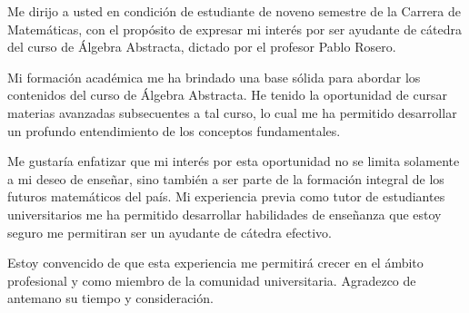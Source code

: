 \documentclass[11pt,a4paper,sans]{moderncv}        %
\begin{document}
Me dirijo a usted en condición de estudiante de noveno semestre de la Carrera de Matemáticas, con el propósito de expresar mi interés por ser ayudante de cátedra del curso de Álgebra Abstracta, dictado por el profesor Pablo Rosero.


Mi formación académica  me ha brindado una base sólida para abordar los contenidos del curso de Álgebra Abstracta. He tenido la oportunidad de cursar materias avanzadas subsecuentes a tal curso, lo cual me ha permitido desarrollar un profundo entendimiento de los conceptos fundamentales.



Me gustaría enfatizar que mi interés por esta oportunidad no se limita solamente a mi deseo de enseñar, sino también a ser parte de la formación integral de los futuros matemáticos del país. Mi experiencia previa como tutor de estudiantes universitarios me ha permitido desarrollar habilidades de  enseñanza que estoy seguro me permitiran ser un ayudante de cátedra efectivo.


Estoy convencido de que esta experiencia me permitirá crecer en el ámbito profesional y como  miembro de la comunidad universitaria.
Agradezco de antemano su tiempo y consideración.


~


\makeletterclosing

 
\end{document}
